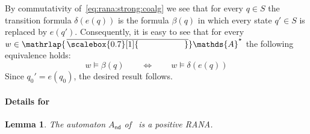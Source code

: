 \documentclass[10pt,a4paper]{amsart}
\newtheorem{lem}[theo]{Lemma}
\theoremstyle{definition}
\newcommand{\At}{\mathds{A}}
\newcommand{\barAs}{\barNames^{\star}}
\newcommand{\op}[1]{\operatorname{\mathsf{#1}}}
\newcommand{\nd}{\op{nd}}
\newcommand{\names}{\At}
\newcommand{\mybar}[3]{%
  \mathrlap{\hspace{#2}\overline{\scalebox{#1}[1]{\phantom{\ensuremath{#3}}}}}\ensuremath{#3}
}
\newcommand{\barNames}{{\mybar{0.7}{1.25pt}{\names}}}
\renewcommand{\vDash}{\models}
\begin{document}
By commutativity of~\eqref{eq:rana:strong:coalg} we see that for every $q \in S$ the transition formula $\delta(e(q))$ is the formula $\beta(q)$ in which every state $q'\in S$ is replaced by $e(q')$.
Consequently, it is easy to see that for every $w \in \barAs$ the following equivalence holds:
\[ w \vDash \beta(q) \qquad\Longleftrightarrow\qquad w \vDash \delta(e(q)) \]
Since $q_0' = e(q_0)$, the desired result follows.

\paragraph*{Details for~}

\begin{lem}
  The automaton $A_{\nd}$ of~ is a positive RANA.
\end{lem}
\end{document}
